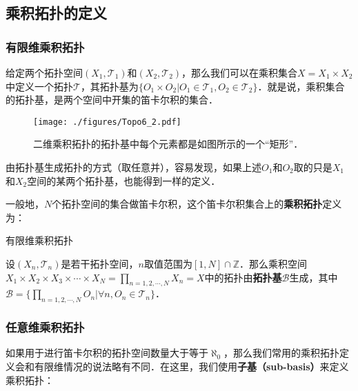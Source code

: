 
\subsection{乘积拓扑的定义}
\subsubsection{有限维乘积拓扑}

给定两个拓扑空间$(X_1, \mathcal{T}_1)$和$(X_2, \mathcal{T}_2)$，那么我们可以在乘积集合$X=X_1\times X_2$中定义一个拓扑$\mathcal{T}$，其拓扑基为$\{O_1\times O_2|O_1\in\mathcal{T_1}, O_2\in\mathcal{T_2}\}$．就是说，乘积集合的拓扑基，是两个空间中开集的笛卡尔积的集合．

\begin{figure}[ht]
\centering
\texttt{[image: ./figures/Topo6\_2.pdf]}
\caption{二维乘积拓扑的拓扑基中每个元素都是如图所示的一个“矩形”．} \label{Topo6_fig2}
\end{figure}

由拓扑基生成拓扑的方式（取任意并），容易发现，如果上述$O_1$和$O_2$取的只是$X_1$和$X_2$空间的某两个拓扑基，也能得到一样的定义．

一般地，$N$个拓扑空间的集合做笛卡尔积，这个笛卡尔积集合上的\textbf{乘积拓扑}定义为：

\begin{definition}{有限维乘积拓扑}

设$(X_n, \mathcal{T}_n)$是若干拓扑空间，$n$取值范围为$[1, N]\cap\mathbb{Z}$．那么乘积空间$X_1\times X_2\times X_3\times\cdots\times X_N=\prod\limits_{n=1,2,\cdots,N}X_n=X$中的拓扑由\textbf{拓扑基}$\mathcal{B}$生成，其中$\mathcal{B}=\{\prod\limits_{n=1,2,\cdots,N}O_n|\forall n, O_n\in\mathcal{T}_n\}$．

\end{definition}



\subsubsection{任意维乘积拓扑}

如果用于进行笛卡尔积的拓扑空间数量大于等于$\aleph_0$，那么我们常用的乘积拓扑定义会和有限维情况的说法略有不同．在这里，我们使用\textbf{子基（sub-basis）}来定义乘积拓扑：

